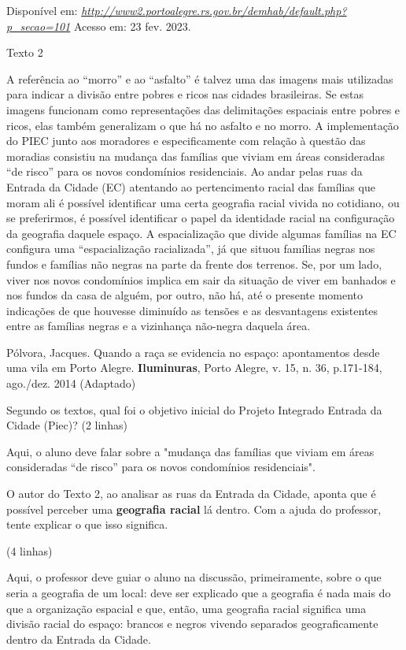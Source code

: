 Disponível em:
\href{http://www2.portoalegre.rs.gov.br/demhab/default.php?p_secao=101}{\emph{http://www2.portoalegre.rs.gov.br/demhab/default.php?p\_secao=101}}
Acesso em: 23 fev. 2023.

Texto 2

A referência ao ``morro'' e ao ``asfalto'' é talvez uma das imagens mais
utilizadas para indicar a divisão entre pobres e ricos nas cidades
brasileiras. Se estas imagens funcionam como representações das
delimitações espaciais entre pobres e ricos, elas também generalizam o
que há no asfalto e no morro. A implementação do PIEC junto aos
moradores e especificamente com relação à questão das moradias consistiu
na mudança das famílias que viviam em áreas consideradas ``de risco''
para os novos condomínios residenciais. Ao andar pelas ruas da Entrada
da Cidade (EC) atentando ao pertencimento racial das famílias que moram
ali é possível identificar uma certa geografia racial vivida no
cotidiano, ou se preferirmos, é possível identificar o papel da
identidade racial na configuração da geografia daquele espaço. A
espacialização que divide algumas famílias na EC configura uma
``espacialização racializada'', já que situou famílias negras nos fundos
e famílias não negras na parte da frente dos terrenos. Se, por um lado,
viver nos novos condomínios implica em sair da situação de viver em
banhados e nos fundos da casa de alguém, por outro, não há, até o
presente momento indicações de que houvesse diminuído as tensões e as
desvantagens existentes entre as famílias negras e a vizinhança
não-negra daquela área.

Pólvora, Jacques. Quando a raça se evidencia no espaço: apontamentos
desde uma vila em Porto Alegre. \textbf{Iluminuras}, Porto Alegre, v.
15, n. 36, p.171-184, ago./dez. 2014 (Adaptado)

Segundo os textos, qual foi o objetivo inicial do Projeto Integrado
Entrada da Cidade (Piec)? (2 linhas)

Aqui, o aluno deve falar sobre a "mudança das famílias que viviam em
áreas consideradas ``de risco'' para os novos condomínios residenciais".

O autor do Texto 2, ao analisar as ruas da Entrada da Cidade, aponta que
é possível perceber uma \textbf{geografia racial} lá dentro. Com a ajuda
do professor, tente explicar o que isso significa.

(4 linhas)

Aqui, o professor deve guiar o aluno na discussão, primeiramente, sobre
o que seria a geografia de um local: deve ser explicado que a geografia
é nada mais do que a organização espacial e que, então, uma geografia
racial significa uma divisão racial do espaço: brancos e negros vivendo
separados geograficamente dentro da Entrada da Cidade.

